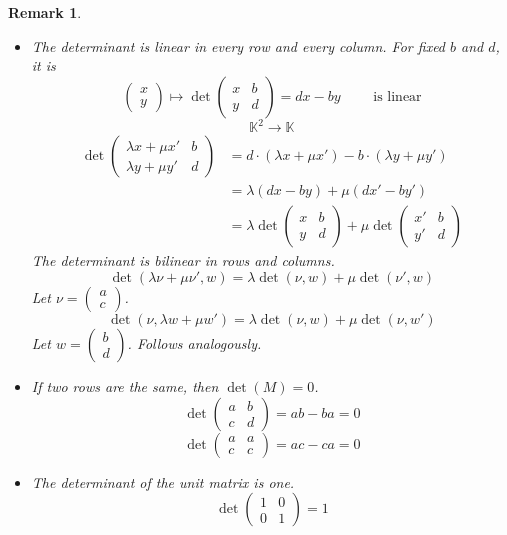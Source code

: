 \documentclass{article}
\newcounter{lecref}[section]
\numberwithin{lecref}{section}
\newtheorem{remark}[lecref]{Remark}
\newcommand{\vectwo}[2]{\begin{pmatrix} #1 \\ #2 \end{pmatrix}}
\begin{document}
\begin{remark} \hfill{}
  \begin{itemize}
    \item The determinant is linear in every row and every column.
      For fixed $b$ and $d$, it is
      \[ \vectwo xy \mapsto \det{\begin{pmatrix} x & b \\ y & d \end{pmatrix}} = dx - by \qquad \text{ is linear} \]
      \[ \mathbb K^2 \to \mathbb K \]
      \begin{align*}
        \det{\begin{pmatrix} \lambda x + \mu x' & b \\ \lambda y + \mu y' & d \end{pmatrix}}
          &= d \cdot (\lambda x + \mu x') - b \cdot (\lambda y + \mu y') \\
          &= \lambda (dx - by) + \mu (dx' - by') \\
          &= \lambda \det{\begin{pmatrix} x & b \\ y & d \end{pmatrix}} + \mu \det{\begin{pmatrix} x' & b \\  y' & d \end{pmatrix}}
      \end{align*}
      The determinant is bilinear in rows and columns.
      \[ \det(\lambda \nu + \mu \nu', w) = \lambda \det(\nu, w) + \mu \det(\nu', w) \]
      Let $\nu = \vectwo{a}{c}$.
      \[ \det(\nu, \lambda w + \mu w') = \lambda \det(\nu, w) + \mu \det(\nu, w') \]
      Let $w = \vectwo bd$.
      Follows analogously.
    \item If two rows are the same, then $\det(M) = 0$.
      \[ \det\begin{pmatrix} a & b \\ c & d \end{pmatrix} = ab - ba = 0 \]
      \[ \det\begin{pmatrix} a & a \\ c & c \end{pmatrix} = ac - ca = 0 \]
    \item The determinant of the unit matrix is one.
      \[ \det\begin{pmatrix} 1 & 0 \\ 0 & 1 \end{pmatrix} = 1 \]
  \end{itemize}
\end{remark}
\end{document}
